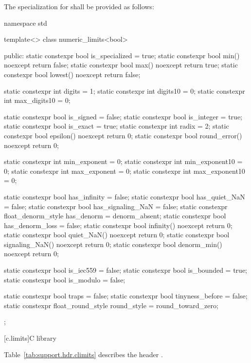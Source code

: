 \pnum
The specialization for
shall be provided as follows:
%
\begin{codeblock}
namespace std {
   template<> class numeric_limits<bool> {
   public:
     static constexpr bool is_specialized = true;
     static constexpr bool min() noexcept { return false; }
     static constexpr bool max() noexcept { return true; }
     static constexpr bool lowest() noexcept { return false; }

     static constexpr int  digits = 1;
     static constexpr int  digits10 = 0;
     static constexpr int  max_digits10 = 0;

     static constexpr bool is_signed = false;
     static constexpr bool is_integer = true;
     static constexpr bool is_exact = true;
     static constexpr int  radix = 2;
     static constexpr bool epsilon() noexcept { return 0; }
     static constexpr bool round_error() noexcept { return 0; }

     static constexpr int  min_exponent = 0;
     static constexpr int  min_exponent10 = 0;
     static constexpr int  max_exponent = 0;
     static constexpr int  max_exponent10 = 0;

     static constexpr bool has_infinity = false;
     static constexpr bool has_quiet_NaN = false;
     static constexpr bool has_signaling_NaN = false;
     static constexpr float_denorm_style has_denorm = denorm_absent;
     static constexpr bool has_denorm_loss = false;
     static constexpr bool infinity() noexcept { return 0; }
     static constexpr bool quiet_NaN() noexcept { return 0; }
     static constexpr bool signaling_NaN() noexcept { return 0; }
     static constexpr bool denorm_min() noexcept { return 0; }

     static constexpr bool is_iec559 = false;
     static constexpr bool is_bounded = true;
     static constexpr bool is_modulo = false;

     static constexpr bool traps = false;
     static constexpr bool tinyness_before = false;
     static constexpr float_round_style round_style = round_toward_zero;
   };
}
\end{codeblock}

[c.limits]{C library}

\pnum
Table~\ref{tab:support.hdr.climits} describes the header
.

